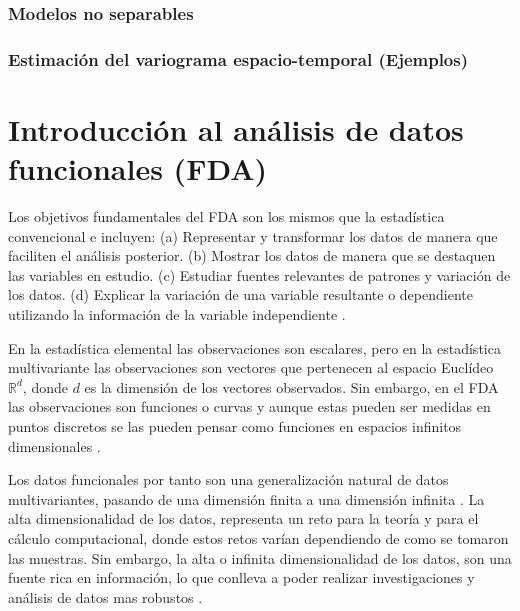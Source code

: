 \documentclass[
]{book}
\begin{document}
\hypertarget{modelos-no-separables}{%
\subsection{Modelos no separables}\label{modelos-no-separables}}

\hypertarget{estimaciuxf3n-del-variograma-espacio-temporal-ejemplos}{%
\subsection{Estimación del variograma espacio-temporal (Ejemplos)}\label{estimaciuxf3n-del-variograma-espacio-temporal-ejemplos}}

\hypertarget{introducciuxf3n-al-anuxe1lisis-de-datos-funcionales-fda}{%
\chapter{Introducción al análisis de datos funcionales (FDA)}\label{introducciuxf3n-al-anuxe1lisis-de-datos-funcionales-fda}}

Los objetivos fundamentales del FDA son los mismos que la estadística convencional e incluyen: (a) Representar y transformar los datos de manera que faciliten el análisis posterior. (b) Mostrar los datos de manera que se destaquen las variables en estudio. (c) Estudiar fuentes relevantes de patrones y variación de los datos. (d) Explicar la variación de una variable resultante o dependiente utilizando la información de la variable independiente \citep{raichle}.

En la estadística elemental las observaciones son escalares, pero en la estadística multivariante las observaciones son vectores que pertenecen al espacio Euclídeo \(\mathbb{R}^d\), donde \(d\) es la dimensión de los vectores observados. Sin embargo, en el FDA las observaciones son funciones o curvas y aunque estas pueden ser medidas en puntos discretos se las pueden pensar como funciones en espacios infinitos dimensionales \citep{kokoska}.

Los datos funcionales por tanto son una generalización natural de datos multivariantes, pasando de una dimensión finita a una dimensión infinita \citep{jin}. La alta dimensionalidad de los datos, representa un reto para la teoría y para el cálculo computacional, donde estos retos varían dependiendo de como se tomaron las muestras. Sin embargo, la alta o infinita dimensionalidad de los datos, son una fuente rica en información, lo que conlleva a poder realizar investigaciones y análisis de datos mas robustos \citep{wang}.
\end{document}
